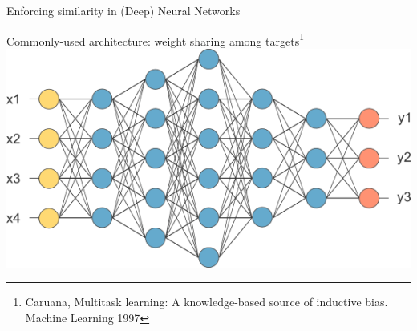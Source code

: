 \documentclass[]{beamer}
\newcommand{\bx}{\boldsymbol{x}}
\begin{document}
%
%
%
%
%
%
%
%
%

\begin{frame}{Enforcing similarity in (Deep) Neural Networks}
\begin{center}
Commonly-used architecture: weight sharing among targets\footnote{Caruana, Multitask learning: A knowledge-based source of inductive bias. Machine
Learning 1997} \\
\vspace{0.2cm}
\includegraphics[scale=0.6]{Figures/weightsharing}
\end{center}
\end{frame}
\end{document}
